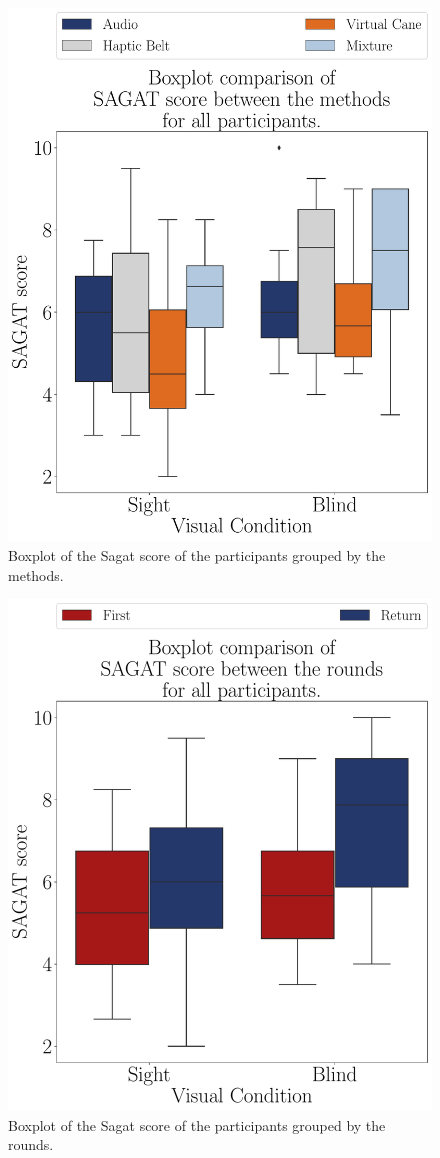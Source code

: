 \begin{figure}[!htb]
    \centering
    \includegraphics[width = 0.75\linewidth]{Resultados/Sagat/Figuras/pdf/boxplot_sagat_4_scene.pdf}
    \caption{Boxplot of the Sagat score of the participants grouped by the methods.}
    \label{fig:boxplot_sagat_4_scene}
\end{figure}
\begin{figure}[!htb]
    \centering
    \includegraphics[width = 0.75\linewidth]{Resultados/Sagat/Figuras/pdf/boxplot_sagat_4_rounds.pdf}
    \caption{Boxplot of the Sagat score of the participants grouped by the rounds.}
    \label{fig:boxplot_sagat_4_rounds}
\end{figure}

